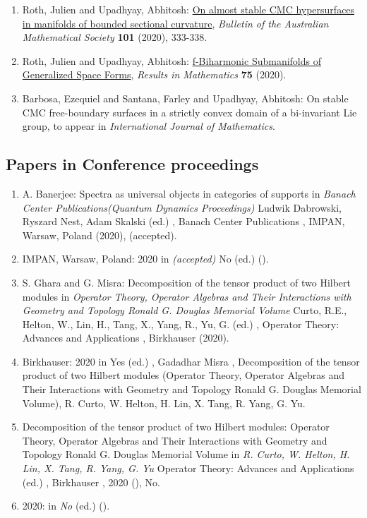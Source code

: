 \begin{enumerate}
\item Roth, Julien and Upadhyay, Abhitosh: \href{https://www.cambridge.org/core/journals/bulletin-of-the-australian-mathematical-society/article/on-almost-stable-cmc-hypersurfaces-in-manifolds-of-bounded-sectional-curvature/E0BF84D4D46C82F6D75CDCEAAF5DEE94}{On almost stable CMC hypersurfaces in manifolds of bounded sectional curvature}, \emph{Bulletin of the Australian Mathematical Society} {\bf 101} (2020), 333-338.
\item Roth, Julien and Upadhyay, Abhitosh: \href{https://link.springer.com/article/10.1007/s00025-019-1142-4?shared-article-renderer#citeas}{f-Biharmonic Submanifolds of Generalized Space Forms}, \emph{Results in Mathematics} {\bf 75} (2020).
\item Barbosa, Ezequiel and Santana, Farley and Upadhyay, Abhitosh: On stable CMC free-boundary surfaces in a strictly convex domain of a bi-invariant Lie group, to appear in \emph{International Journal of Mathematics}.
\end{enumerate}


\subsection{Papers in Conference proceedings}

\begin{enumerate}
\item A. Banerjee: Spectra as universal objects in categories of supports in {\em Banach Center Publications(Quantum Dynamics Proceedings)} Ludwik Dabrowski, Ryszard Nest, Adam Skalski (ed.) , Banach Center Publications , IMPAN, Warsaw, Poland (2020), (accepted).
\item IMPAN, Warsaw, Poland: 2020 in {\em (accepted)} No (ed.)   ().
\item S. Ghara and G. Misra: Decomposition of the tensor product of two Hilbert modules in {\em Operator Theory, Operator Algebras and Their Interactions with Geometry and Topology Ronald G. Douglas Memorial Volume} Curto, R.E., Helton, W., Lin, H., Tang, X., Yang, R., Yu, G. (ed.) , Operator Theory: Advances and Applications , Birkhauser (2020).
\item Birkhauser: 2020 in {\em } Yes (ed.) , Gadadhar Misra , Decomposition of the tensor product of two Hilbert modules (Operator Theory, Operator Algebras and Their Interactions with Geometry and Topology Ronald G. Douglas Memorial Volume), R. Curto, W. Helton, H. Lin, X. Tang, R. Yang, G. Yu.
\item Decomposition of the tensor product of two Hilbert modules: Operator Theory, Operator Algebras and Their Interactions with Geometry and Topology Ronald G. Douglas Memorial Volume in {\em R. Curto, W. Helton, H. Lin, X. Tang, R. Yang, G. Yu} Operator Theory: Advances and Applications (ed.) , Birkhauser , 2020 (), No.
\item 2020:  in {\em No}  (ed.)   ().
\end{enumerate}


